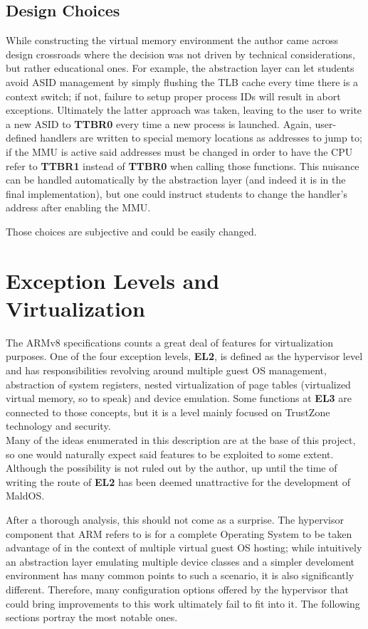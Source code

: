 \documentclass[12pt,a4paper,openright,twoside]{report}
\begin{document}
\subsection{Design Choices}
While constructing the virtual memory environment the author came across design 
crossroads where the decision was not driven by technical considerations, but
rather educational ones.
For example, the abstraction layer can let students avoid ASID management by 
simply flushing the TLB cache every time there is a context switch; if not,
failure to setup proper process IDs will result in abort exceptions. Ultimately 
the latter approach was taken, leaving to the user to write a new ASID to 
\textbf{TTBR0} every time a new process is launched.
Again, user-defined handlers are written to special memory locations as addresses
to jump to; if the MMU is active said addresses must be changed in order to 
have the CPU refer to \textbf{TTBR1} instead of \textbf{TTBR0} when calling those
functions. This nuisance can be handled automatically by the abstraction layer
(and indeed it is in the final implementation), but one could instruct students
to change the handler's address after enabling the MMU.

Those choices are subjective and could be easily changed.

\section{Exception Levels and Virtualization}
The ARMv8 specifications counts a great deal of features for virtualization
purposes. One of the four exception levels, \textbf{EL2}, is defined as the
hypervisor level and has responsibilities revolving around multiple guest OS management,
abstraction of system registers, nested virtualization of page tables (virtualized
virtual memory, so to speak) and device emulation. Some functions at \textbf{EL3} 
are connected to those concepts, but it is a level mainly focused on TrustZone 
technology and security. \\
Many of the ideas enumerated in this description are at the base of this project,
so one would naturally expect said features to be exploited to some extent.
Although the possibility is not ruled out by the author, up until the time of 
writing the route of \textbf{EL2} has been deemed unattractive for the development
of MaldOS.

After a thorough analysis, this should not come as a surprise. The hypervisor 
component that ARM refers to is for a complete Operating System to be taken advantage
of in the context of multiple virtual guest OS hosting; while intuitively an 
abstraction layer emulating multiple device classes and a simpler develoment 
environment has many common points to such a scenario, it is also significantly different. Therefore,
many configuration options offered by the hypervisor that could bring improvements to this
work ultimately fail to fit into it. The following sections portray the most 
notable ones.
\end{document}
